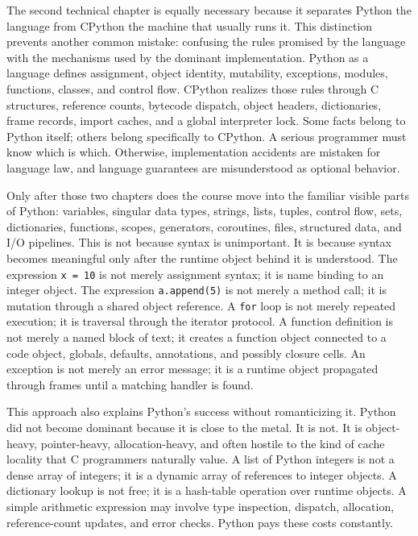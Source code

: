 \documentclass[a4paper,twoside]{report}
\begin{document}
The second technical chapter is equally necessary because it separates Python the language from CPython the machine that usually runs it. This distinction prevents another common mistake: confusing the rules promised by the language with the mechanisms used by the dominant implementation. Python as a language defines assignment, object identity, mutability, exceptions, modules, functions, classes, and control flow. CPython realizes those rules through C structures, reference counts, bytecode dispatch, object headers, dictionaries, frame records, import caches, and a global interpreter lock. Some facts belong to Python itself; others belong specifically to CPython. A serious programmer must know which is which. Otherwise, implementation accidents are mistaken for language law, and language guarantees are misunderstood as optional behavior.

Only after those two chapters does the course move into the familiar visible parts of Python: variables, singular data types, strings, lists, tuples, control flow, sets, dictionaries, functions, scopes, generators, coroutines, files, structured data, and I/O pipelines. This is not because syntax is unimportant. It is because syntax becomes meaningful only after the runtime object behind it is understood. The expression \texttt{x = 10} is not merely assignment syntax; it is name binding to an integer object. The expression \texttt{a.append(5)} is not merely a method call; it is mutation through a shared object reference. A \texttt{for} loop is not merely repeated execution; it is traversal through the iterator protocol. A function definition is not merely a named block of text; it creates a function object connected to a code object, globals, defaults, annotations, and possibly closure cells. An exception is not merely an error message; it is a runtime object propagated through frames until a matching handler is found.

This approach also explains Python’s success without romanticizing it. Python did not become dominant because it is close to the metal. It is not. It is object-heavy, pointer-heavy, allocation-heavy, and often hostile to the kind of cache locality that C programmers naturally value. A list of Python integers is not a dense array of integers; it is a dynamic array of references to integer objects. A dictionary lookup is not free; it is a hash-table operation over runtime objects. A simple arithmetic expression may involve type inspection, dispatch, allocation, reference-count updates, and error checks. Python pays these costs constantly.
\end{document}
